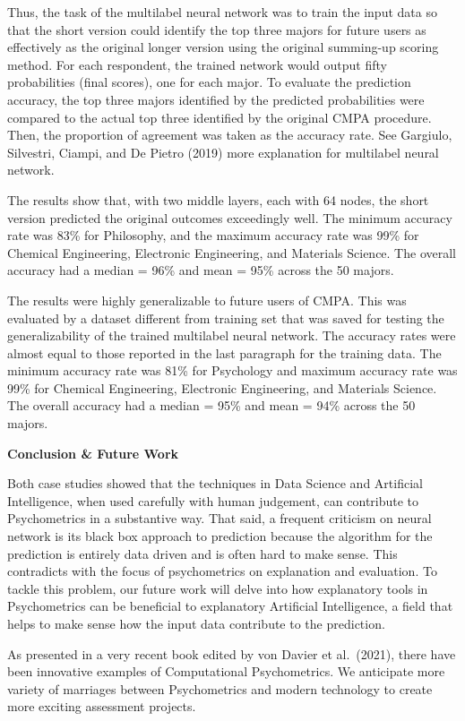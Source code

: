 \documentclass[
]{book}
\begin{document}
Thus, the task of the multilabel neural network was to train the input data so that the short version could identify the top three majors for future users as effectively as the original longer version using the original summing-up scoring method. For each respondent, the trained network would output fifty probabilities (final scores), one for each major. To evaluate the prediction accuracy, the top three majors identified by the predicted probabilities were compared to the actual top three identified by the original CMPA procedure. Then, the proportion of agreement was taken as the accuracy rate. See Gargiulo, Silvestri, Ciampi, and De Pietro (2019) more explanation for multilabel neural network.

The results show that, with two middle layers, each with 64 nodes, the short version predicted the original outcomes exceedingly well. The minimum accuracy rate was 83\% for Philosophy, and the maximum accuracy rate was 99\% for Chemical Engineering, Electronic Engineering, and Materials Science. The overall accuracy had a median = 96\% and mean = 95\% across the 50 majors.

The results were highly generalizable to future users of CMPA. This was evaluated by a dataset different from training set that was saved for testing the generalizability of the trained multilabel neural network. The accuracy rates were almost equal to those reported in the last paragraph for the training data. The minimum accuracy rate was 81\% for Psychology and maximum accuracy rate was 99\% for Chemical Engineering, Electronic Engineering, and Materials Science. The overall accuracy had a median = 95\% and mean = 94\% across the 50 majors.

\textbf{Conclusion \& Future Work}

Both case studies showed that the techniques in Data Science and Artificial Intelligence, when used carefully with human judgement, can contribute to Psychometrics in a substantive way. That said, a frequent criticism on neural network is its black box approach to prediction because the algorithm for the prediction is entirely data driven and is often hard to make sense. This contradicts with the focus of psychometrics on explanation and evaluation. To tackle this problem, our future work will delve into how explanatory tools in Psychometrics can be beneficial to explanatory Artificial Intelligence, a field that helps to make sense how the input data contribute to the prediction.

As presented in a very recent book edited by von Davier et al.~(2021), there have been innovative examples of Computational Psychometrics. We anticipate more variety of marriages between Psychometrics and modern technology to create more exciting assessment projects.
\end{document}
